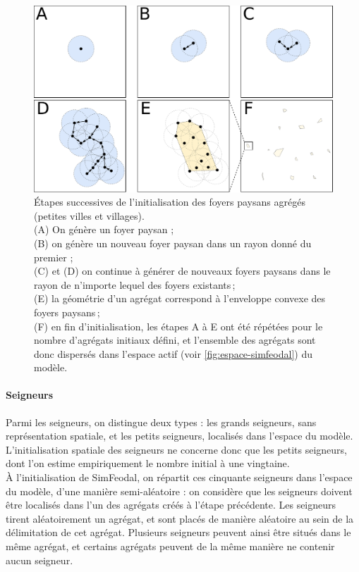 \begin{figure}[H]
	\centering
	\includegraphics[width=.98\linewidth]{img/init_fp.pdf}
	\caption{Étapes successives de l'initialisation des foyers paysans agrégés (petites villes et villages).\\
	(A) On génère un foyer paysan ;\\
	(B) on génère un nouveau foyer paysan dans un rayon donné du premier ;\\
	(C) et (D) on continue à générer de nouveaux foyers paysans dans le rayon de n'importe lequel des foyers existants ;\\
	(E) la géométrie d'un agrégat correspond à l'enveloppe convexe des foyers paysans ;\\
	(F) en fin d'initialisation, les étapes A à E ont été répétées pour le nombre d'agrégats initiaux défini, et l'ensemble des agrégats sont donc dispersés dans l'espace actif (voir \cref{fig:espace-simfeodal}) du modèle.}
	\label{fig:init-fp}
\end{figure}


\paragraph{Seigneurs}
Parmi les seigneurs, on distingue deux types : les grands seigneurs, sans représentation spatiale, et les petits seigneurs, localisés dans l'espace du modèle.
L'initialisation spatiale des seigneurs ne concerne donc que les petits seigneurs, dont l'on estime empiriquement le nombre initial à une vingtaine.\\
À l'initialisation de SimFeodal, on répartit ces cinquante seigneurs dans l'espace du modèle, d'une manière semi-aléatoire : on considère que les seigneurs doivent être localisés dans l'un des agrégats créés à l'étape précédente.
Les seigneurs tirent aléatoirement un agrégat, et sont placés de manière aléatoire au sein de la délimitation de cet agrégat.
Plusieurs seigneurs peuvent ainsi être situés dans le même agrégat, et certains agrégats peuvent de la même manière ne contenir aucun seigneur.

